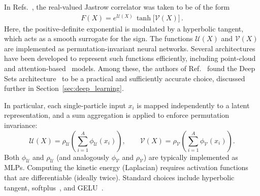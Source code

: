 In Refs.~\cite{adams_variational_2021,gnech_calculation_2020,yang_consistent_2022},
the real-valued Jastrow correlator was taken to be of the form
\begin{align}
F(X) = e^{\mathcal{U}(X)}\,\tanh\!\big[\mathcal{V}(X)\big]\,.
\label{eq:jastrow_tanh}
\end{align}
Here, the positive-definite exponential is modulated by a hyperbolic tangent, which acts as a smooth surrogate for the sign. The functions $\mathcal{U}(X)$ and $\mathcal{V}(X)$ are implemented as permutation-invariant neural networks. Several architectures have been developed to represent such functions efficiently, including point-cloud~\cite{charles_pointnet_2017} and attention-based~\cite{vinyals_pointer_2015,vaswani_attention_2017,lee_set_2018}
models. Among these, the authors of Ref.~\cite{adams_variational_2021} found the Deep Sets architecture~\cite{zaheer_deep_2017,wagstaff_limitations_2019} to be a practical and sufficiently accurate choice, discussed further in Section~\ref{sec:deep_learning}.

In particular, each single-particle input $x_i$ is mapped independently to a latent representation, and a sum aggregation is applied to enforce permutation invariance:
\begin{equation}
\mathcal{U}(X)
= \rho_{\mathcal U}\!\left(\sum_{i=1}^A \phi_{\mathcal U}(x_i)\right),
\qquad
\mathcal{V}(X)
= \rho_{\mathcal V}\!\left(\sum_{i=1}^A \phi_{\mathcal V}(x_i)\right).
\label{eq:deep_sets_single}
\end{equation}
Both $\phi_{\mathcal U}$ and $\rho_{\mathcal U}$ (and analogously $\phi_{\mathcal V}$ and $\rho_{\mathcal V}$) are typically implemented as MLPs. Computing the kinetic energy (Laplacian) requires activation functions that are differentiable (ideally twice). Standard choices include hyperbolic tangent, softplus~\cite{dugas_incorporating_2001}, and GELU~\cite{hendrycks_gaussian_2023}.



